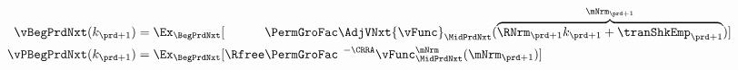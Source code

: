   \begin{equation}\begin{gathered}\begin{aligned}
        \vBegPrdNxt({k}_{\prd+1})    & = \Ex_{\BegPrdNxt}[\phantom{\Rfree}\PermGroFac\AdjVNxt {\vFunc}_{\MidPrdNxt}(\overbrace{\RNrm_{\prd+1}{k}_{\prd+1}+{\tranShkEmp}_{\prd+1}}^{\mNrm_{\prd+1}})] \label{eq:vFuncBegtpdefn} \\
        \vPBegPrdNxt({k}_{\prd+1}) & = \Ex_{\BegPrdNxt}[\Rfree \PermGroFac^{\phantom{1}-\CRRA} {\vFunc}_{\MidPrdNxt}^{\mNrm}(\mNrm_{\prd+1})]
      \end{aligned}\end{gathered}\end{equation}
